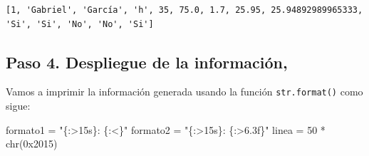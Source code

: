 \documentclass[
  spanish,
  letterpaper,
]{scrbook}
\newenvironment{Shaded}{\begin{snugshade}}{\end{snugshade}}
\newcommand{\BaseNTok}[1]{\textcolor[rgb]{0.68,0.00,0.00}{#1}}
\newcommand{\BuiltInTok}[1]{\textcolor[rgb]{0.00,0.23,0.31}{#1}}
\newcommand{\DecValTok}[1]{\textcolor[rgb]{0.68,0.00,0.00}{#1}}
\newcommand{\NormalTok}[1]{\textcolor[rgb]{0.00,0.23,0.31}{#1}}
\newcommand{\OperatorTok}[1]{\textcolor[rgb]{0.37,0.37,0.37}{#1}}
\newcommand{\SpecialCharTok}[1]{\textcolor[rgb]{0.37,0.37,0.37}{#1}}
\newcommand{\StringTok}[1]{\textcolor[rgb]{0.13,0.47,0.30}{#1}}
\theoremstyle{definition}
\theoremstyle{remark}
\begin{document}
\begin{verbatim}
[1, 'Gabriel', 'García', 'h', 35, 75.0, 1.7, 25.95, 25.94892989965333, 'Si', 'Si', 'No', 'No', 'Si']
\end{verbatim}

\subsection{Paso 4. Despliegue de la
información,}\label{paso-4.-despliegue-de-la-informaciuxf3n}

Vamos a imprimir la información generada usando la función
\texttt{str.format()} como sigue:

\begin{Shaded}
\begin{Highlighting}[]
\NormalTok{formato1 }\OperatorTok{=} \StringTok{"}\SpecialCharTok{\{:\textgreater{}15s\}}\StringTok{: }\SpecialCharTok{\{:\textless{}\}}\StringTok{"}
\NormalTok{formato2 }\OperatorTok{=} \StringTok{"}\SpecialCharTok{\{:\textgreater{}15s\}}\StringTok{: }\SpecialCharTok{\{:\textgreater{}6.3f\}}\StringTok{"}
\NormalTok{linea }\OperatorTok{=} \DecValTok{50} \OperatorTok{*} \BuiltInTok{chr}\NormalTok{(}\BaseNTok{0x2015}\NormalTok{)}
    

\end{Highlighting}
\end{Shaded}
\end{document}
